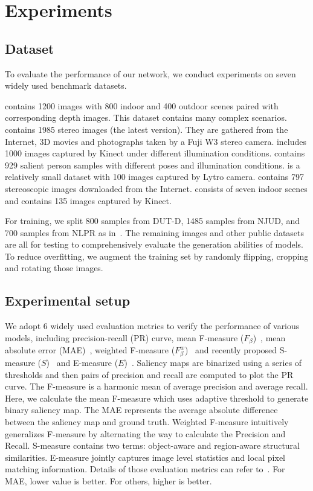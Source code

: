 \documentclass[runningheads]{llncs}
\begin{document}
\section{Experiments}

\subsection{Dataset}
To evaluate the performance of our network, we conduct experiments on seven widely used benchmark datasets.

 contains 1200 images with 800 indoor and 400 outdoor scenes paired with corresponding depth images. This dataset contains many complex scenarios.
 contains 1985 stereo images (the latest version). They are gathered from the Internet, 3D movies and photographs taken by a Fuji W3 stereo camera.
 includes 1000 images captured by Kinect under different illumination conditions.
 contains 929 salient person samples with different poses and illumination conditions.
 is a relatively small dataset with 100 images captured by Lytro camera.
 contains 797 stereoscopic images downloaded from the Internet.
  consists of seven indoor scenes and contains 135 images captured by Kinect.

For training, we split 800 samples from DUT-D, 1485 samples from NJUD, and 700 samples from NLPR as in~\cite{3DPCA,3DTANet,3DDMRA}.
The remaining images and other public datasets are all for testing to comprehensively evaluate the generation abilities of models.
To reduce overfitting, we augment the training set by randomly flipping, cropping and rotating those images.


\subsection{Experimental setup}
We adopt 6 widely used evaluation metrics to verify the performance of various models, including precision-recall (PR) curve, mean F-measure ($F_{\beta}$)~\cite{Fmeasure}, mean absolute error (MAE)~\cite{Benchmark}, weighted F-measure ($F_{\beta}^w$)~\cite{weightedF} and recently proposed S-measure ($S$)~\cite{Smeasure} and E-measure ($E$)~\cite{Emeasure}.
Saliency maps are binarized using a series of thresholds and then pairs of precision and recall are computed to plot the PR curve.
The F-measure is a harmonic mean of average precision and average recall.
Here, we calculate the mean F-measure which uses adaptive threshold to generate binary saliency map.
The MAE represents the average absolute difference between the saliency map and ground truth.
Weighted F-measure intuitively generalizes F-measure by alternating the way to calculate the Precision and Recall.
S-measure contains two terms: object-aware and region-aware structural similarities.
E-measure jointly captures image level statistics and local pixel matching information.
Details of those evaluation metrics can refer to~\cite{2DDeep}.
For MAE, lower value is better. For others, higher is better. 
\end{document}
